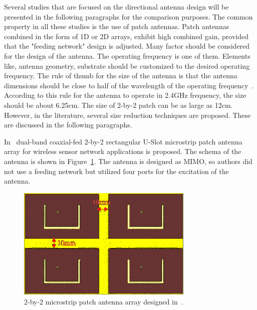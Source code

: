 \documentclass[12pt, oneandhalf, chaparabic, sees, ms]{metu}
\begin{document}
Several studies that are focused on the directional antenna design will be presented in the following paragraphs for the comparison purposes.
The common property in all these studies is the use of patch antennas. Patch antennas combined in the form of 1D or 2D arrays, exhibit high combined gain, 
provided that the "feeding network" design is adjusted. Many factor should be considered for the design of the antenna. The operating frequency is one of them.
Elements like, antenna geometry, substrate should be customized to the desired operating frequency. The rule of thumb for the size of the antenna is that the 
antenna dimensions should be close to half of the wavelength of the operating frequency~\cite[p.~542]{balanis2016}. According to this rule for the antenna to 
operate in 2.4GHz frequency, the size should be about 6.25cm. The size of 2-by-2 patch can be as large as 12cm.
However, in the literature, several size reduction techniques are proposed. These are discussed in the following paragraphs.



In~\cite{ali2013} dual-band coaxial-fed 2-by-2 rectangular U-Slot microstrip patch antenna array for wireless sensor network applications is proposed.
The schema of the antenna is shown in Figure~\ref{fig:ali}. The antenna is designed as MIMO, so authors did not use a feeding network but utilized four ports for the excitation
of the antenna.
\vspace{2cm}
%
%
%
\begin{figure}[!htbp]
 \begin{center}
  \includegraphics[width=0.75\textwidth]{ali-antenna-color.png}
 \end{center}
 \caption{2-by-2 microstrip patch antenna array designed in~\cite{ali2013}.}
  \label{fig:ali}
\end{figure}
% 
%
%
\end{document}
